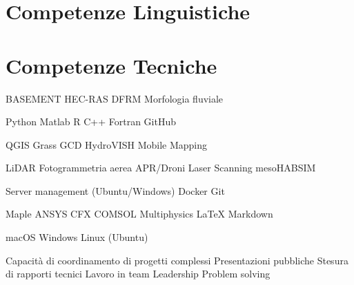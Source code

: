 
\section{Competenze Linguistiche}

\sectionsep

\sectionsep

\sectionsep

\section{Competenze Tecniche}

BASEMENT \textbullet{} HEC-RAS \textbullet{} DFRM \textbullet{} Morfologia fluviale
\sectionsep

Python \textbullet{} Matlab \textbullet{} R \textbullet{} C++ \textbullet{} Fortran \textbullet{} GitHub
\sectionsep

QGIS \textbullet{} Grass \textbullet{} GCD \textbullet{} HydroVISH \textbullet{} Mobile Mapping
\sectionsep

LiDAR \textbullet{} Fotogrammetria aerea \textbullet{} APR/Droni \textbullet{} Laser Scanning \textbullet{} mesoHABSIM
\sectionsep

Server management (Ubuntu/Windows) \textbullet{} Docker \textbullet{} Git
\sectionsep

Maple \textbullet{} ANSYS CFX \textbullet{} COMSOL Multiphysics \textbullet{} LaTeX \textbullet{} Markdown
\sectionsep

macOS \textbullet{} Windows \textbullet{} Linux (Ubuntu)
\sectionsep

Capacità di coordinamento di progetti complessi \textbullet{} Presentazioni pubbliche \textbullet{} Stesura di rapporti tecnici \textbullet{} Lavoro in team \textbullet{} Leadership \textbullet{} Problem solving
\sectionsep

